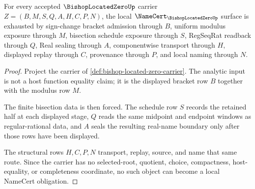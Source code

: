 \begin{theorem}
\label{thm:bishop-located-zero-namecert-obligations}
For every accepted $\BishopLocatedZeroUp$ carrier $Z=(B,M,S,Q,A,H,C,P,N)$, the local $\NameCert_{\BishopLocatedZeroUp}$ surface is exhausted by sign-change bracket admission through $B$, uniform modulus exposure through $M$, bisection schedule exposure through $S$, RegSeqRat readback through $Q$, Real sealing through $A$, componentwise transport through $H$, displayed replay through $C$, provenance through $P$, and local naming through $N$.
\end{theorem}
\begin{proof}
Project the carrier of \autoref{def:bishop-located-zero-carrier}. The analytic input is not a host function equality claim; it is the displayed bracket row $B$ together with the modulus row $M$.

The finite bisection data is then forced. The schedule row $S$ records the retained half at each displayed stage, $Q$ reads the same midpoint and endpoint windows as regular-rational data, and $A$ seals the resulting real-name boundary only after those rows have been displayed.

The structural rows $H,C,P,N$ transport, replay, source, and name that same route. Since the carrier has no selected-root, quotient, choice, compactness, host-equality, or completeness coordinate, no such object can become a local NameCert obligation.
\end{proof}

